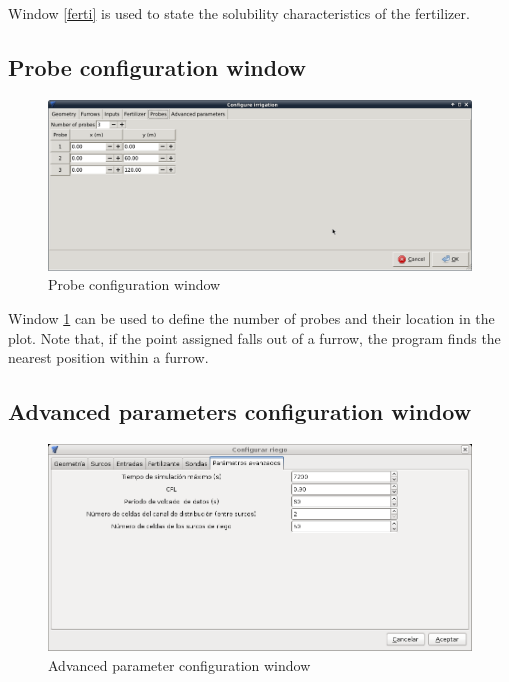 Window \ref{ferti} is used to state the solubility characteristics of the fertilizer. 

\subsection{Probe configuration window}

\begin{figure}[!h]
\begin{center}
\includegraphics*[width=\textwidth]{images/confSondasEN.png}
\qquad
\caption{Probe configuration window}\label{sondas}
\end{center}
\end{figure}

Window \ref{sondas} can be used to define the number of probes and their location in the plot. Note that, if the point assigned falls out of a furrow, the program finds the nearest position within a furrow.

\subsection{Advanced parameters configuration window}

\begin{figure}[!h]
\begin{center}
\includegraphics*[width=\textwidth]{images/confParam.png}
\qquad
\caption{Advanced parameter configuration window}\label{param}
\end{center}
\end{figure}

